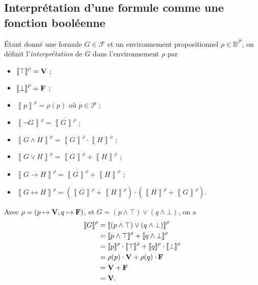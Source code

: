 \subsection{Interprétation d'une formule comme une fonction booléenne}

\begin{defn}[Interprétation]
	Étant donné une formule $G \in \mathcal{F}$ et un environnement propositionnel $\rho \in \mathds{B}^{\mathcal{P}}$, on définit l'{\it interprétation}\/ de $G$\/ dans l'environnement $\rho$\/ par
	\begin{itemize}
		\item $\left\llbracket \top \right\rrbracket^{\rho} = {\mathbf{V}}\/$\/ ;
		\item $\left\llbracket \bot \right\rrbracket^{\rho} = {\mathbf{F}}\/$\/ ;
		\item $\left\llbracket p \right\rrbracket^{\rho} = \rho(p)$\/ où $p \in \mathcal{P}$\/ ;
		\item $\left\llbracket \lnot G \right\rrbracket ^{\rho} = \overline{\left\llbracket G \right\rrbracket^{\rho}}$\/ ;
		\item $\left\llbracket G \land H \right\rrbracket ^{\rho} = \left\llbracket G \right\rrbracket ^{\rho} \cdot \left\llbracket H \right\rrbracket ^{\rho}$\/ ;
		\item $\left\llbracket G \lor H \right\rrbracket^{\rho} = \left\llbracket G \right\rrbracket ^{\rho} + \left\llbracket H \right\rrbracket ^{\rho}$\/ ;
		\item $\left\llbracket G \to H \right\rrbracket ^{\rho} = \overline{\left\llbracket G \right\rrbracket^{\rho}} + \left\llbracket H \right\rrbracket ^{\rho}$\/ ;
		\item $\left\llbracket G \leftrightarrow H \right\rrbracket ^{\rho} = \left( \overline{\left\llbracket G \right\rrbracket^\rho} + \left\llbracket H \right\rrbracket ^\rho \right)  \cdot \left( \overline{\left\llbracket H \right\rrbracket^\rho} + \left\llbracket G \right\rrbracket^\rho \right)$.
	\end{itemize}
\end{defn}

\begin{exm}
	Avec $\rho = (p \mapsto {\mathbf{V}}, q \mapsto {\mathbf{F}}\/)$, et $G = (p \land \top) \lor (q \land \bot)$, on a
	\begin{align*}
		\left\llbracket G \right\rrbracket^\rho &= \left\llbracket (p \land \top) \lor (q \land\bot) \right\rrbracket^\rho \\
		&= \left\llbracket p \land \top \right\rrbracket^\rho + \left\llbracket q \land \bot \right\rrbracket^\rho \\
		&= \left\llbracket p \right\rrbracket^{\rho} \cdot \left\llbracket \top \right\rrbracket^{\rho} + \left\llbracket q \right\rrbracket^\rho \cdot\left\llbracket \bot \right\rrbracket^\rho \\
		&= \rho(p) \cdot {\mathbf{V}}\/ + \rho(q) \cdot {\mathbf{F}}\/ \\
		&= {\mathbf{V}}\/ + {\mathbf{F}}\/ \\
		&= {\mathbf{V}}. \\
	\end{align*}
\end{exm}

